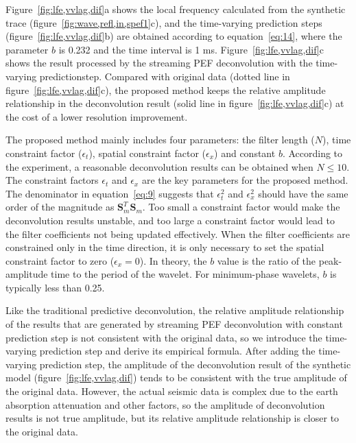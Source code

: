 Figure~\ref{fig:lfe,vvlag,dif}a shows the local frequency calculated from
the synthetic trace (figure~\ref{fig:wave,refl,in,spef1}c), and the 
time-varying prediction steps (figure~\ref{fig:lfe,vvlag,dif}b) are obtained 
according to equation~\ref{eq:14}, where the parameter $b$ is 0.232 and the 
time interval is 1 ms. Figure~\ref{fig:lfe,vvlag,dif}c shows the result 
processed by the streaming PEF deconvolution with the time-varying 
predictionstep. Compared with original data (dotted line in
figure~\ref{fig:lfe,vvlag,dif}c), the proposed method keeps the relative
amplitude relationship in the deconvolution result
(solid line in figure~\ref{fig:lfe,vvlag,dif}c) at the cost of a lower
resolution improvement.

              
The proposed method mainly includes four parameters: the filter length
($N$), time constraint factor ($\epsilon_t$), spatial constraint factor
($\epsilon_x$) and constant $b$. According to the experiment, a reasonable
deconvolution results can be obtained when $N\le10$. The constraint factors
$\epsilon_t$ and $\epsilon_x$ are the key parameters for the proposed method.
The denominator in equation~\ref{eq:9} suggests that $\epsilon_t^2$
and $\epsilon_x^2$ should have the same order of the magnitude as
$\mathbf{S}_m^T\mathbf{S}_m$. Too small a constraint factor would make the
deconvolution results unstable, and too large a constraint factor would lead
to the filter coefficients not being updated effectively. When the filter 
coefficients are constrained only in the time direction, it is only necessary
to set the spatial constraint factor to zero ($\epsilon_x=0$). In theory,
the $b$ value is the ratio of the peak-amplitude time to the period
of the wavelet. For minimum-phase wavelets, $b$ is typically less than 0.25.

Like the traditional predictive deconvolution, the relative amplitude
relationship of the results that are generated by streaming PEF
deconvolution with constant prediction step is not consistent with the
original data, so we introduce the time-varying prediction step and derive
its empirical formula. After adding the time-varying prediction step, the
amplitude of the deconvolution result of the synthetic model
(figure~\ref{fig:lfe,vvlag,dif}) tends to be consistent with the true
amplitude of the original data. However, the actual seismic data is complex
due to the earth absorption attenuation and other factors, so the amplitude
of deconvolution results is not true amplitude, but its relative amplitude
relationship is closer to the original data.

